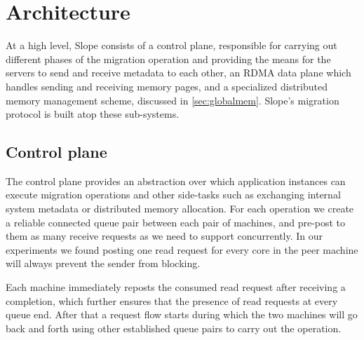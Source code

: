 \section{Architecture}
At a high level, Slope consists of a control plane, responsible for carrying out
different phases of the migration operation and providing the means for the
servers to send and receive metadata to each other, an RDMA data plane
which handles sending and receiving memory pages,
and a specialized distributed memory management scheme, discussed in 
\autoref{sec:globalmem}. Slope's migration protocol is built atop these sub-systems.


\subsection{Control plane}
The control plane provides an abstraction over which application instances can
execute migration operations and other side-tasks such as exchanging internal
system metadata or distributed memory allocation. For each operation we create
a reliable connected queue pair between each pair of machines, and pre-post to
them as many receive requests as we need to support concurrently. In our
experiments we found posting one read request for every core in the peer machine
will always prevent the sender from blocking.

Each machine immediately reposts
the consumed read request after receiving a completion, which further ensures
that the presence of read requests at every queue end. After that a request
flow starts during which the two machines will go back and forth using other
established queue pairs to carry out the operation.





